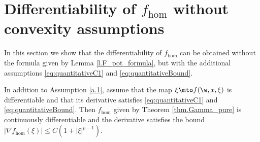 \appendix

\section{Differentiability of \texorpdfstring{$f_{\hom}$}{} without convexity assumptions}\label{app:0}
In this section we show that the differentiability of $f_{\hom}$ can be obtained without the formula given by Lemma \ref{l.F_pot_formula}, but with the additional assumptions \eqref{eq:quantitativeC1} and \eqref{eq:quantitativeBound}.
\begin{lemma}\label{l.app_diff}
In addition to Assumption \ref{a.1}, assume that the map $\xi\mto f(\w,x,\xi)$ is differentiable and that its derivative satisfies \eqref{eq:quantitativeC1} and \eqref{eq:quantitativeBound}. Then $f_{\hom}$ given by Theorem \ref{thm.Gamma_pure} is continuously differentiable and the derivative satisfies the bound $|\nabla f_{\hom}(\xi)|\leq C(1+|\xi|^{p-1})$.
\end{lemma}
